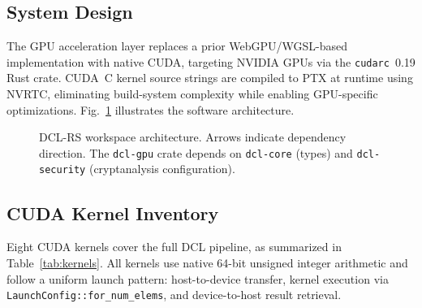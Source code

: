 \documentclass[lettersize,journal]{IEEEtran}
\begin{document}
\subsection{System Design}

The GPU acceleration layer replaces a prior WebGPU/WGSL-based implementation with native CUDA, targeting NVIDIA GPUs via the \texttt{cudarc}~0.19 Rust crate. CUDA~C kernel source strings are compiled to PTX at runtime using NVRTC, eliminating build-system complexity while enabling GPU-specific optimizations. Fig.~\ref{fig:arch} illustrates the software architecture.

\begin{figure}[!t]
\centering
{}
\caption{DCL-RS workspace architecture. Arrows indicate dependency direction. The \texttt{dcl-gpu} crate depends on \texttt{dcl-core} (types) and \texttt{dcl-security} (cryptanalysis configuration).}
\label{fig:arch}
\end{figure}

\subsection{CUDA Kernel Inventory}

Eight CUDA kernels cover the full DCL pipeline, as summarized in Table~\ref{tab:kernels}. All kernels use native 64-bit unsigned integer arithmetic and follow a uniform launch pattern: host-to-device transfer, kernel execution via \texttt{LaunchConfig::for\_num\_elems}, and device-to-host result retrieval.
\end{document}
